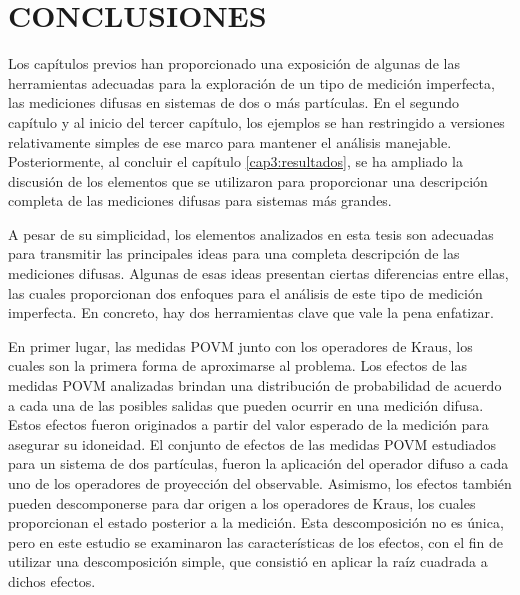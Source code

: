 \chapter{CONCLUSIONES}

Los capítulos previos han proporcionado una exposición de algunas de las
herramientas adecuadas para la exploración de un tipo de medición imperfecta,
las mediciones difusas en sistemas de dos o más partículas. En el segundo
capítulo y al inicio del tercer capítulo, los ejemplos se han restringido a
versiones relativamente simples de ese marco para mantener el análisis
manejable. Posteriormente,  al concluir el capítulo {\ref{cap3:resultados}}, se
ha ampliado la discusión de los elementos que se utilizaron para proporcionar
una descripción completa de las mediciones difusas para sistemas más grandes.

A pesar de su simplicidad, los elementos analizados en esta tesis son adecuadas
para transmitir las principales ideas para una completa descripción de las
mediciones difusas. Algunas de esas ideas presentan ciertas diferencias entre
ellas, las cuales proporcionan dos enfoques para el análisis de este tipo de
medición imperfecta. En concreto, hay dos herramientas clave que vale la pena
enfatizar. 

En primer lugar, las medidas POVM junto con los operadores de Kraus, los cuales
son la primera forma de aproximarse al problema. Los efectos de las medidas
POVM  analizadas brindan una distribución de probabilidad de acuerdo a cada una
de las posibles salidas que pueden ocurrir en una medición difusa. Estos
efectos fueron originados a partir del valor esperado de la medición para
asegurar su idoneidad. El conjunto de efectos de las medidas POVM estudiados
para un sistema de dos partículas, fueron la aplicación del operador difuso a
cada uno de los operadores de proyección del observable. Asimismo, los efectos
también pueden descomponerse  para dar origen a los operadores de Kraus, los
cuales proporcionan el estado posterior a la medición. Esta descomposición no
es única, pero en este estudio se examinaron las características de los
efectos, con el fin de utilizar una descomposición simple, que consistió en
aplicar la raíz cuadrada a dichos efectos.

